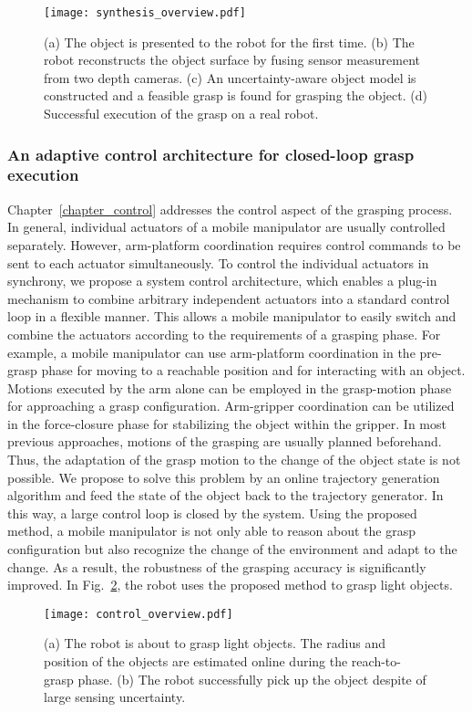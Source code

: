 \begin{figure}[!htbp]
\centering
\texttt{[image: synthesis\_overview.pdf]}
\captionsetup{justification=raggedright}
\caption{(a) The object is presented to the robot for the first time. (b) The robot reconstructs the object surface by fusing sensor measurement from two depth cameras. (c) An uncertainty-aware object model is constructed and a feasible grasp is found for grasping the object. (d) Successful execution of the grasp on a real robot.}
\label{fig:synthesis_overview}
\end{figure} 
\subsubsection{An adaptive control architecture for closed-loop grasp execution}
Chapter~\ref{chapter_control} addresses the control aspect of the grasping process. In general, individual actuators of a mobile manipulator are usually controlled separately. However, arm-platform coordination requires control commands to be sent to each actuator simultaneously. To control the individual actuators in synchrony, we propose a system control architecture, which enables a plug-in mechanism to combine arbitrary independent actuators into a standard control loop in a flexible manner. This allows a mobile manipulator to easily switch and combine the actuators according to the requirements of a grasping phase. For example, a mobile manipulator can use arm-platform coordination in the pre-grasp phase for moving to a reachable position and for interacting with an object. Motions executed by the arm alone can be employed in the grasp-motion phase for approaching a grasp configuration. Arm-gripper coordination can be utilized in the force-closure phase for  stabilizing the object within the gripper. In most previous approaches, motions of the grasping are usually planned beforehand. Thus, the adaptation of the grasp motion to the change of the object state is not possible. We propose to solve this problem by an online trajectory generation algorithm and feed the state of the object back to the trajectory generator. In this way, a large control loop is closed by the system. Using the proposed method, a mobile manipulator is not only able to reason about the grasp configuration but also recognize the change of the environment and adapt to the change. As a result, the robustness of the grasping accuracy is significantly improved. In Fig.~\ref{fig:control_overview}, the robot uses the proposed method to grasp light objects. 
\begin{figure}[!htbp]
\centering
\texttt{[image: control\_overview.pdf]}
\captionsetup{justification=raggedright}
\caption{(a) The robot is about to grasp light objects. The radius and position of the objects are estimated online during the reach-to-grasp phase. (b) The robot successfully pick up the object despite of large sensing uncertainty.}
\label{fig:control_overview}
\end{figure} 

